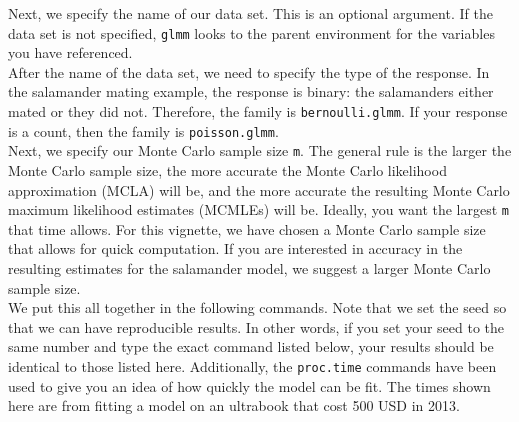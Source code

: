 \documentclass[article]{jss}
\begin{document}
Next,  we specify the name of our data set. This is an optional argument. If the data set is not specified, \texttt{glmm} looks to the parent environment for the variables you have referenced. \\

After the name of the data set, we need to specify the type of the response. In the salamander mating example, the response is binary: the salamanders either mated or they did not. Therefore, the family is \texttt{bernoulli.glmm}. If your response is a count, then the family is \texttt{poisson.glmm}.\\

Next, we specify our Monte Carlo sample size \texttt{m}. The general rule is the larger the Monte Carlo sample size, the more accurate the Monte Carlo likelihood approximation (MCLA) will be, and the more accurate the resulting Monte Carlo maximum likelihood estimates (MCMLEs) will be. Ideally, you want the largest \texttt{m} that time allows. For this vignette, we have chosen a Monte Carlo sample size that allows for quick computation. If you are interested in accuracy in the resulting estimates for the salamander model, we suggest a larger Monte Carlo sample size.  \\


We put this all together in the following commands. Note that we set the seed so that we can have reproducible results. In other words, if you set your seed to the same number and type the exact command listed below, your results should be identical to those listed here. Additionally, the \texttt{proc.time} commands have been used to give you an idea of how quickly the model can be fit. The times shown here are from fitting a model on an ultrabook that cost 500 USD in 2013. 
\end{document}
